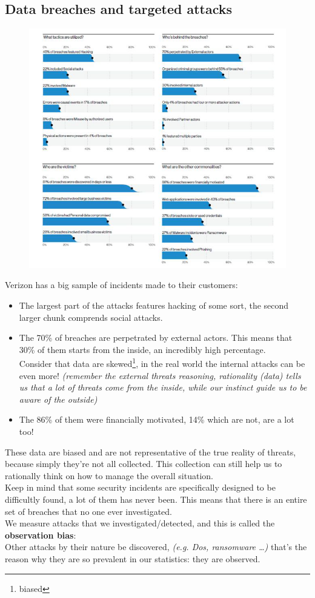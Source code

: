         \subsection{Data breaches and targeted attacks}
            \begin{figure}[ht!]
                \centering
                \includegraphics[width=0.7\linewidth]{verizon.png}
            \end{figure}
            Verizon has a big sample of incidents made to their customers:
            \begin{itemize}
                \item The largest part of the attacks features hacking of some sort, the second larger chunk comprends social attacks.
                \item The 70\% of breaches are perpetrated by external actors. This means that 30\% of them starts from the inside, an incredibly high percentage.\\
                      Consider that data are skewed\footnote{biased}, in the real world the internal attacks can be even more! \textit{(remember the external threats reasoning, rationality (data) tells us that a lot of threats come from the inside, while our instinct guide us to be aware of the outside)}
                \item The 86\% of them were financially motivated, 14\% which are not, are a lot too!
            \end{itemize}
            These data are biased and are not representative of the true reality of threats, because simply they're not all collected. This collection can still help us to rationally think on how to manage the overall situation.\\
            Keep in mind that some security incidents are specifically designed to be difficultly found, a lot of them has never been. This means that there is an entire set of breaches that no one ever investigated.\\
            We measure attacks that we investigated/detected, and this is called the \textbf{observation bias}:\\  
            Other attacks by their nature be discovered, \textit{(e.g. Dos, ransomware \dots)} that's the reason why they are so prevalent in our statistics: they are observed.
